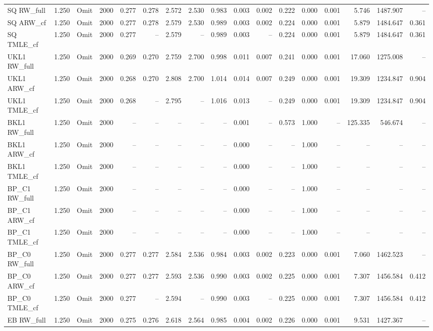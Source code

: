 \begin{tabular}{llllrrrrrrrrrrrrr}
SQ RW\_full & 1.250 & Omit & 2000 & 0.277 & 0.278 & 2.572 & 2.530 & 0.983 & 0.003 & 0.002 & 0.222 & 0.000 & 0.001 & 5.746 & 1487.907 & -- \\
SQ ARW\_cf & 1.250 & Omit & 2000 & 0.277 & 0.278 & 2.579 & 2.530 & 0.989 & 0.003 & 0.002 & 0.224 & 0.000 & 0.001 & 5.879 & 1484.647 & 0.361 \\
SQ TMLE\_cf & 1.250 & Omit & 2000 & 0.277 & -- & 2.579 & -- & 0.989 & 0.003 & -- & 0.224 & 0.000 & 0.001 & 5.879 & 1484.647 & 0.361 \\
UKL1 RW\_full & 1.250 & Omit & 2000 & 0.269 & 0.270 & 2.759 & 2.700 & 0.998 & 0.011 & 0.007 & 0.241 & 0.000 & 0.001 & 17.060 & 1275.008 & -- \\
UKL1 ARW\_cf & 1.250 & Omit & 2000 & 0.268 & 0.270 & 2.808 & 2.700 & 1.014 & 0.014 & 0.007 & 0.249 & 0.000 & 0.001 & 19.309 & 1234.847 & 0.904 \\
UKL1 TMLE\_cf & 1.250 & Omit & 2000 & 0.268 & -- & 2.795 & -- & 1.016 & 0.013 & -- & 0.249 & 0.000 & 0.001 & 19.309 & 1234.847 & 0.904 \\
BKL1 RW\_full & 1.250 & Omit & 2000 & -- & -- & -- & -- & -- & 0.001 & -- & 0.573 & 1.000 & -- & 125.335 & 546.674 & -- \\
BKL1 ARW\_cf & 1.250 & Omit & 2000 & -- & -- & -- & -- & -- & 0.000 & -- & -- & 1.000 & -- & -- & -- & -- \\
BKL1 TMLE\_cf & 1.250 & Omit & 2000 & -- & -- & -- & -- & -- & 0.000 & -- & -- & 1.000 & -- & -- & -- & -- \\
BP\_C1 RW\_full & 1.250 & Omit & 2000 & -- & -- & -- & -- & -- & 0.000 & -- & -- & 1.000 & -- & -- & -- & -- \\
BP\_C1 ARW\_cf & 1.250 & Omit & 2000 & -- & -- & -- & -- & -- & 0.000 & -- & -- & 1.000 & -- & -- & -- & -- \\
BP\_C1 TMLE\_cf & 1.250 & Omit & 2000 & -- & -- & -- & -- & -- & 0.000 & -- & -- & 1.000 & -- & -- & -- & -- \\
BP\_C0 RW\_full & 1.250 & Omit & 2000 & 0.277 & 0.277 & 2.584 & 2.536 & 0.984 & 0.003 & 0.002 & 0.223 & 0.000 & 0.001 & 7.060 & 1462.523 & -- \\
BP\_C0 ARW\_cf & 1.250 & Omit & 2000 & 0.277 & 0.277 & 2.593 & 2.536 & 0.990 & 0.003 & 0.002 & 0.225 & 0.000 & 0.001 & 7.307 & 1456.584 & 0.412 \\
BP\_C0 TMLE\_cf & 1.250 & Omit & 2000 & 0.277 & -- & 2.594 & -- & 0.990 & 0.003 & -- & 0.225 & 0.000 & 0.001 & 7.307 & 1456.584 & 0.412 \\
EB RW\_full & 1.250 & Omit & 2000 & 0.275 & 0.276 & 2.618 & 2.564 & 0.985 & 0.004 & 0.002 & 0.226 & 0.000 & 0.001 & 9.531 & 1427.367 & -- \\

\end{tabular}
